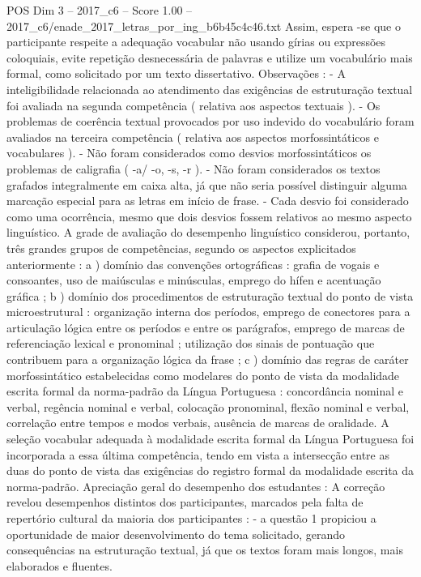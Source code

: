 \begin{textsample}{POS Dim 3 – 2017\_c6 – Score 1.00 – 2017\_c6/enade\_2017\_letras\_por\_ing\_b6b45c4c46.txt}
Assim, espera -se que o participante respeite a adequação vocabular não usando gírias ou expressões coloquiais, evite repetição desnecessária de palavras e utilize um vocabulário mais formal, como solicitado por um texto dissertativo.
Observações : - A inteligibilidade relacionada ao atendimento das exigências de estruturação textual foi avaliada na segunda competência ( relativa aos aspectos textuais ). - Os problemas de coerência textual provocados por uso indevido do vocabulário foram avaliados na terceira competência ( relativa aos aspectos morfossintáticos e vocabulares ). - Não foram considerados como desvios morfossintáticos os problemas de caligrafia ( -a/ -o, -s, -r ). - Não foram considerados os textos grafados integralmente em caixa alta, já que não seria possível distinguir alguma marcação especial para as letras em início de frase. - Cada desvio foi considerado como uma ocorrência, mesmo que dois desvios fossem relativos ao mesmo aspecto linguístico.
A grade de avaliação do desempenho linguístico considerou, portanto, três grandes grupos de competências, segundo os aspectos explicitados anteriormente : a ) domínio das convenções ortográficas : grafia de vogais e consoantes, uso de maiúsculas e minúsculas, emprego do hífen e acentuação gráfica ; b ) domínio dos procedimentos de estruturação textual do ponto de vista microestrutural : organização interna dos períodos, emprego de conectores para a articulação lógica entre os períodos e entre os parágrafos, emprego de marcas de referenciação lexical e pronominal ; utilização dos sinais de pontuação que contribuem para a organização lógica da frase ; c ) domínio das regras de caráter morfossintático estabelecidas como modelares do ponto de vista da modalidade escrita formal da norma-padrão da Língua Portuguesa : concordância nominal e verbal, regência nominal e verbal, colocação pronominal, flexão nominal e verbal, correlação entre tempos e modos verbais, ausência de marcas de oralidade.
A seleção vocabular adequada à modalidade escrita formal da Língua Portuguesa foi incorporada a essa última competência, tendo em vista a intersecção entre as duas do ponto de vista das exigências do registro formal da modalidade escrita da norma-padrão.
Apreciação geral do desempenho dos estudantes : A correção revelou desempenhos distintos dos participantes, marcados pela falta de repertório cultural da maioria dos participantes : - a questão 1 propiciou a oportunidade de maior desenvolvimento do tema solicitado, gerando consequências na estruturação textual, já que os textos foram mais longos, mais elaborados e fluentes.

\end{textsample}
